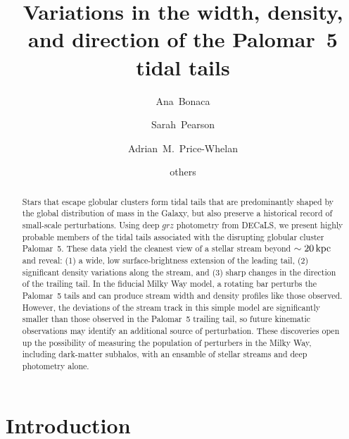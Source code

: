 \documentclass[twocolumn]{aastex62}
\begin{document}
\sloppy\sloppypar\raggedbottom\frenchspacing %

\title{Variations in the width, density, and direction of the Palomar~5 tidal tails}

\author[0000-0002-7846-9787]{Ana~Bonaca}

\author[0000-0003-0256-5446]{Sarah~Pearson}

\author[0000-0003-0872-7098]{Adrian~M.~Price-Whelan}

\author{others}

\begin{abstract}\noindent %
Stars that escape globular clusters form tidal tails that are predominantly shaped by the global distribution of mass in the Galaxy, but also preserve a historical record of small-scale perturbations.
Using deep $grz$ photometry from DECaLS, we present highly probable members of the tidal tails associated with the disrupting globular cluster Palomar~5.
These data yield the cleanest view of a stellar stream beyond $\sim20\,\rm kpc$ and reveal: (1) a wide, low surface-brightness extension of the leading tail, (2) significant density variations along the stream, and (3) sharp changes in the direction of the trailing tail.
In the fiducial Milky Way model, a rotating bar perturbs the Palomar~5 tails and can produce stream width and density profiles like those observed.
However, the deviations of the stream track in this simple model are significantly smaller than those observed in the Palomar~5 trailing tail, so future kinematic observations may identify an additional source of perturbation.
These discoveries open up the possibility of measuring the population of perturbers in the Milky Way, including dark-matter subhalos, with an ensamble of stellar streams and deep photometry alone.
\end{abstract}


\section{Introduction}
\label{sec:intro}
\end{document}
